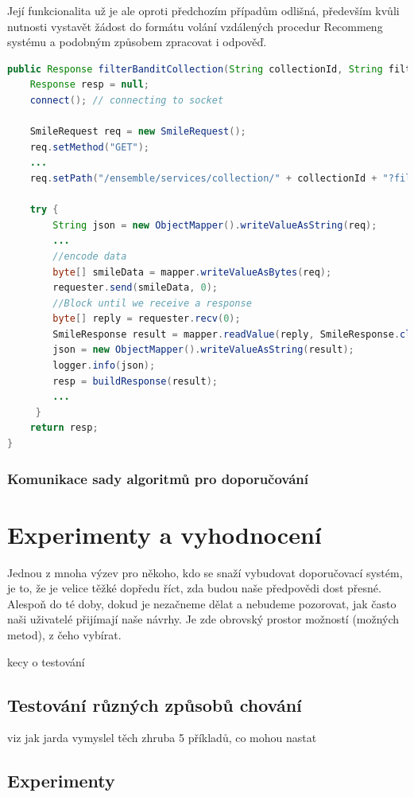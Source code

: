 \documentclass[thesis=M,czech]{FITthesis}[2014/05/07]
\begin{document}
Její funkcionalita už je ale oproti předchozím případům odlišná, především kvůli nutnosti vystavět žádost do formátu volání vzdálených procedur Recommeng systému a podobným způsobem zpracovat i odpověď.

\begin{lstlisting}[language=java]
public Response filterBanditCollection(String collectionId, String filter) {
    Response resp = null;
    connect(); // connecting to socket

    SmileRequest req = new SmileRequest();
    req.setMethod("GET");
	...
    req.setPath("/ensemble/services/collection/" + collectionId + "?filter=" + filter);

    try {
        String json = new ObjectMapper().writeValueAsString(req);
		...
        //encode data
        byte[] smileData = mapper.writeValueAsBytes(req);
        requester.send(smileData, 0);
        //Block until we receive a response
        byte[] reply = requester.recv(0);
        SmileResponse result = mapper.readValue(reply, SmileResponse.class);
        json = new ObjectMapper().writeValueAsString(result);
        logger.info(json);
        resp = buildResponse(result);            
     	...
     }
    return resp;        
}    
\end{lstlisting}

\subsection{Komunikace sady algoritmů pro doporučování}
\label{sec:alg}


\chapter{Experimenty a vyhodnocení}
\label{chap:tests}

Jednou z mnoha výzev pro někoho, kdo se snaží vybudovat doporučovací systém, je to, že je velice těžké dopředu říct, zda budou naše předpovědi dost přesné. Alespoň do té doby, dokud je nezačneme dělat a nebudeme pozorovat, jak často naši uživatelé přijímají naše návrhy. Je zde obrovský prostor možností (možných metod), z čeho vybírat. 

kecy o testování
\section{Testování různých způsobů chování}
viz jak jarda vymyslel těch zhruba 5 příkladů, co mohou nastat
\section{Experimenty}
\end{document}
